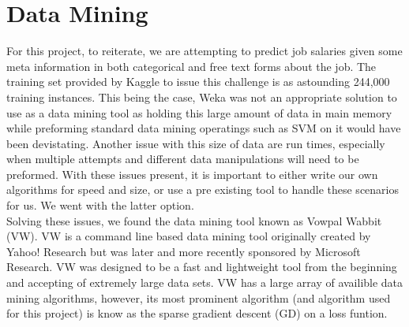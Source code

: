\section{Data Mining}
\label{sec:dm}

For this project, to reiterate, we are attempting to predict job salaries given some meta information in both categorical and free text forms
about the job. The training set provided by Kaggle to issue this challenge is as astounding 244,000 training instances. This being the case,
Weka was not an appropriate solution to use as a data mining tool as holding this large amount of data in main memory while preforming standard
data mining operatings such as SVM on it would have been devistating. Another issue with this size of data are run times, especially when 
multiple attempts and different data manipulations will need to be preformed. With these issues present, it is important to either write
our own algorithms for speed and size, or use a pre existing tool to handle these scenarios for us. We went with the latter option.\\

Solving these issues, we found the data mining tool known as Vowpal Wabbit (VW). VW is a command line based data mining tool originally
created by Yahoo! Research but was later and more recently sponsored by Microsoft Research. VW was designed to be a fast and lightweight
tool from the beginning and accepting of extremely large data sets. VW has a large array of availible data mining algorithms, however,
its most prominent algorithm (and algorithm used for this project) is know as the sparse gradient descent (GD) on a loss funtion.\\

